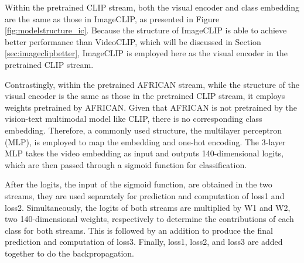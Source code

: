 Within the pretrained CLIP stream, both the visual encoder and class embedding are the same as those in ImageCLIP, as presented in Figure \ref{fig:modelstructure_ic}. Because the structure of ImageCLIP is able to achieve better performance than VideoCLIP, which will be discussed in Section \ref{sec:imageclipbetter}, ImageCLIP is employed here as the visual encoder in the pretrained CLIP stream. 

Contrastingly, within the pretrained AFRICAN stream, while the structure of the visual encoder is the same as those in the pretrained CLIP stream, it employs weights pretrained by AFRICAN. Given that AFRICAN is not pretrained by the vision-text multimodal model like CLIP, there is no corresponding class embedding. Therefore, a commonly used structure, the multilayer perceptron (MLP), is employed to map the embedding and one-hot encoding. The 3-layer MLP takes the video embedding as input and outputs 140-dimensional logits, which are then passed through a sigmoid function for classification.

After the logits, the input of the sigmoid function, are obtained in the two streams, they are used separately for prediction and computation of loss1 and loss2. Simultaneously, the logits of both streams are multiplied by W1 and W2, two 140-dimensional weights, respectively to determine the contributions of each class for both streams. This is followed by an addition to produce the final prediction and computation of loss3. Finally, loss1, loss2, and loss3 are added together to do the backpropagation. 
